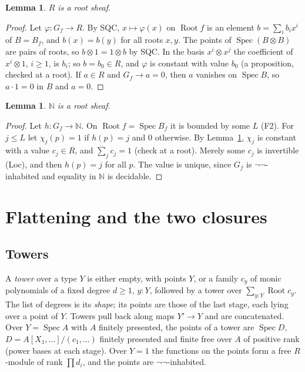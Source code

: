 \documentclass[11pt]{amsart}
\newtheorem{lemma}[theorem]{Lemma}
\theoremstyle{definition}
\theoremstyle{remark}
\newcommand{\Spec}{\operatorname{Spec}}
\newcommand{\Root}{\operatorname{Root}}
\newcommand{\N}{\mathbb N}
\begin{document}
\begin{lemma}\label{l:Rsheaf}
$R$ is a root sheaf.
\end{lemma}
\begin{proof}
Let $\varphi:G_f\to R$. By SQC, $x\mapsto\varphi(x)$ on $\Root f$ is an
element $b=\sum_ib_ix^i$ of $B=B_f$, and $b(x)=b(y)$ for all roots $x,y$.
The points of $\Spec(B\otimes B)$ are pairs of roots, so
$b\otimes1=1\otimes b$ by SQC. In the basis $x^i\otimes x^j$ the
coefficient of $x^i\otimes1$, $i\geq1$, is $b_i$; so $b=b_0\in R$, and
$\varphi$ is constant with value $b_0$ (a proposition, checked at a
root). If $a\in R$ and $G_f\to a=0$, then $a$ vanishes on $\Spec B$, so
$a\cdot1=0$ in $B$ and $a=0$.
\end{proof}

\begin{lemma}\label{l:Nsheaf}
$\N$ is a root sheaf.
\end{lemma}
\begin{proof}
Let $h:G_f\to\N$. On $\Root f=\Spec B_f$ it is bounded by some $L$ (F2).
For $j\leq L$ let $\chi_j(p)=1$ if $h(p)=j$ and $0$ otherwise. By
Lemma~\ref{l:Rsheaf}, $\chi_j$ is constant with a value $c_j\in R$, and
$\sum_jc_j=1$ (check at a root). Merely some $c_j$ is invertible (Loc),
and then $h(p)=j$ for all $p$. The value is unique, since $G_f$ is
$\neg\neg$-inhabited and equality in $\N$ is decidable.
\end{proof}

\section{Flattening and the two closures}

\subsection{Towers}
A \emph{tower} over a type $Y$ is either empty, with points $Y$, or a
family $c_y$ of monic polynomials of a fixed degree $d\geq1$, $y:Y$,
followed by a tower over $\sum_{y:Y}\Root c_y$. The list of degrees is
its \emph{shape}; its points are those of the last stage, each lying over
a point of $Y$. Towers pull back along maps $Y'\to Y$ and are concatenated.
Over $Y=\Spec A$ with $A$ finitely presented, the points of a tower are
$\Spec D$, $D=A[X_1,\dots]/(c_1,\dots)$ finitely presented and finite free
over $A$ of positive rank (power bases at each stage). Over $Y=1$ the
functions on the points form a free $R$-module of rank $\prod d_i$, and
the points are $\neg\neg$-inhabited.
\end{document}
